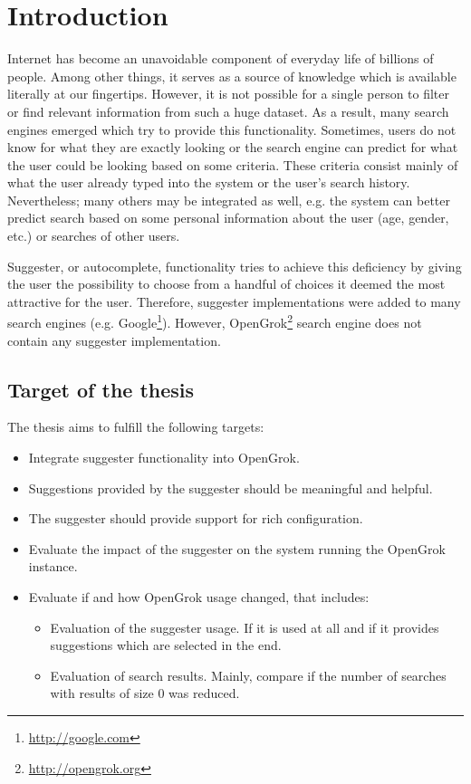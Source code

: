 \chapter*{Introduction}

Internet has become an unavoidable component of everyday life of billions of people. Among other things, it serves as a
source of knowledge which is available literally at our fingertips. However, it is not possible for a single person to
filter or find relevant information from such a huge dataset. As a result, many search engines emerged which try to
provide this functionality. Sometimes, users do not know for what they are exactly looking or the search engine can
predict for what the user could be looking based on some criteria. These criteria consist mainly of what the user
already typed into the system or the user's search history. Nevertheless; many others may be integrated as well, e.g.
the system can better predict search based on some personal information about the user (age, gender, etc.) or
searches of other users.


Suggester, or autocomplete, functionality tries to achieve this deficiency by giving the user the possibility to choose
from a handful of choices it deemed the most attractive for the user. Therefore, suggester implementations were added to
many search engines (e.g. Google\footnote{\url{http://google.com}}). However, OpenGrok\footnote{\url{http://opengrok.org}}
search engine does not contain any suggester implementation.

\section{Target of the thesis}

The thesis aims to fulfill the following targets:
\begin{itemize}
    \item Integrate suggester functionality into OpenGrok.
    \item Suggestions provided by the suggester should be meaningful and helpful.
    \item The suggester should provide support for rich configuration.
    \item Evaluate the impact of the suggester on the system running the OpenGrok instance.
    \item Evaluate if and how OpenGrok usage changed, that includes:
    \begin{itemize}
        \item Evaluation of the suggester usage. If it is used at all and if it provides suggestions which are
        selected in the end.
        \item Evaluation of search results. Mainly, compare if the number of searches with results of size 0 was reduced.
    \end{itemize}
\end{itemize}

